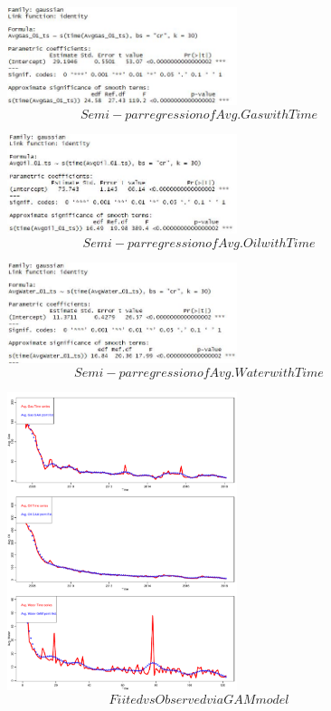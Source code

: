 \documentclass[a4paper]{article}
\begin{document}
\begin{enumerate}
\begin{figure}
	\centering
	\includegraphics[width=0.6\textwidth]{GasGam}
	\caption{$$Semi-par regression of Avg. Gas with Time$$}
	\label{fig1:GasGam}
\end{figure}

\begin{figure}
	\centering
	\includegraphics[width=0.6\textwidth]{OilGam}
	\caption{$$Semi-par regression of Avg. Oil with Time$$}
	\label{fig1:OilGam}
\end{figure}   

\begin{figure}
	\centering
	\includegraphics[width=0.6\textwidth]{WaterGam}
	\caption{$$Semi-par regression of Avg. Water with Time$$}
	\label{fig1:WaterGam}
\end{figure}	


\begin{figure}
	\centering
	\includegraphics[width=0.6\textwidth]{GAMFitsUntransformed}
	\caption{$$Fiited vs Observed via GAM model$$}
	\label{fig1:GAMFitsUntransformed}
\end{figure}



\end{enumerate}
\end{document}
